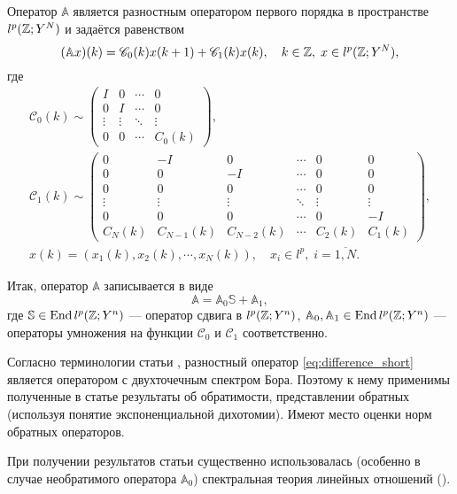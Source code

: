 Оператор $\mathbb A$ является разностным оператором первого порядка в пространстве $l^p(\mathbb{Z}; Y^N)$ и задаётся равенством
\begin{equation}\label{eq:difference_first_order}
(\mathbb A x)(k) = \mathcal C_0(k) x(k + 1) + \mathcal C_1(k) x(k) , \quad k \in \mathbb{Z}, \; x \in l^p(\mathbb{Z}; Y^N),
\end{equation}
где
\begin{gather*}
   \mathcal C_0(k) \sim \begin{pmatrix}
    I & 0 & \cdots &  0 \\
    0 & I  & \cdots &  0 \\
    \vdots & \vdots & \ddots &  \vdots \\
    0 & 0 & \cdots &  C_0(k)
   \end{pmatrix},\\
   \mathcal C_1(k) \sim \begin{pmatrix}
    0 & -I & 0  & \cdots & 0 & 0 \\
    0 & 0  & -I & \cdots & 0 & 0 \\
    0 & 0  & 0 & \cdots & 0 & 0 \\
    \vdots & \vdots & \vdots & \ddots & \vdots & \vdots \\
    0 & 0 & 0 & \cdots & 0 & -I \\
    C_N(k) & C_{N-1}(k) & C_{N-2}(k) & \cdots & C_2(k) & C_1(k)
   \end{pmatrix},\\[0.5em]
   x(k) = (x_1(k), x_2(k), \cdots, x_N(k)), \quad x_i \in l^p, \; i = \overline{1,N}.
\end{gather*}

Итак, оператор $\mathbb A$ записывается в виде
\begin{equation}\label{eq:difference_short}
    \mathbb A = \mathbb A_0 \mathbb S + \mathbb A_1,
\end{equation}
где $\mathbb S \in \operatorname{End} l^p(\mathbb{Z}; Y^n)$ --- оператор сдвига в $l^p(\mathbb{Z}; Y^n)$, $\mathbb A_0, \mathbb A_1 \in \operatorname{End} l^p(\mathbb{Z}; Y^n)$ --- операторы умножения на функции $\mathcal C_0$ и $\mathcal C_1$ соответственно.

Согласно терминологии статьи \cite{bohr2005}, разностный оператор \ref{eq:difference_short} является оператором с двухточечным спектром Бора. Поэтому к нему применимы полученные в статье результаты об обратимости, представлении обратных (используя понятие экспоненциальной дихотомии). Имеют место оценки норм обратных операторов.

При получении результатов статьи \cite{bohr2005} существенно использовалась (особенно в случае необратимого оператора $\mathbb A_0$) спектральная теория линейных отношений (\cite{relations2002, relations2008}).

